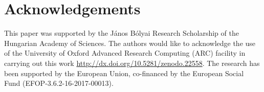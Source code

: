 \documentclass[number]{elsarticle}
\begin{document}
\section*{Acknowledgements}
This paper was supported by the J\'anos B\'olyai Research Scholarship of the
Hungarian Academy of Sciences. The authors would like to acknowledge the use of
the University of Oxford Advanced Research Computing (ARC) facility in carrying
out this work \url{http://dx.doi.org/10.5281/zenodo.22558}. The research has
been supported by the European Union, co-financed by the European Social Fund
(EFOP-3.6.2-16-2017-00013).
%
%



%
%
\appendix


\end{document}
